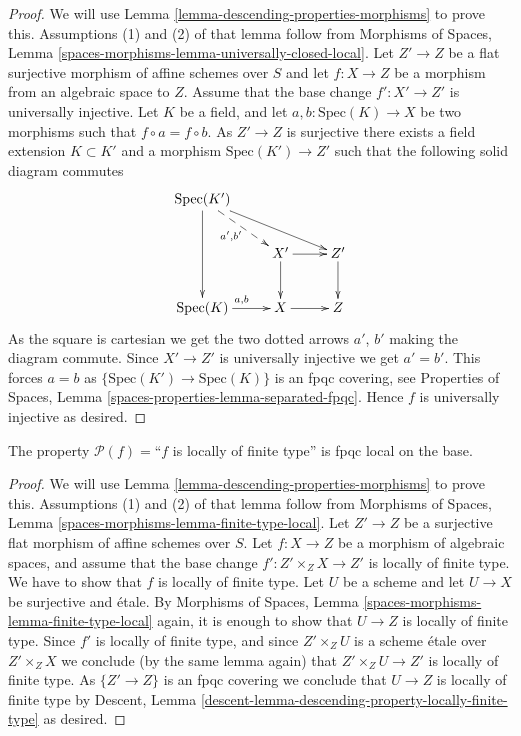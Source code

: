 \begin{proof}
We will use
Lemma \ref{lemma-descending-properties-morphisms}
to prove this. Assumptions (1) and (2) of that lemma follow from
Morphisms of Spaces,
Lemma \ref{spaces-morphisms-lemma-universally-closed-local}.
Let $Z' \to Z$ be a flat surjective morphism of affine schemes
over $S$ and let $f : X \to Z$ be a morphism from an algebraic space to $Z$.
Assume that the base change $f' : X' \to Z'$ is universally injective.
Let $K$ be a field, and let $a, b : \text{Spec}(K) \to X$
be two morphisms such that $f \circ a = f \circ b$.
As $Z' \to Z$ is surjective there exists a field
extension $K \subset K'$ and a morphism
$\text{Spec}(K') \to Z'$
such that the following solid diagram commutes
$$
\xymatrix{
\text{Spec}(K') \ar[rrd] \ar@{-->}[rd]_{a', b'} \ar[dd] \\
 &
X' \ar[r] \ar[d] &
Z' \ar[d] \\
\text{Spec}(K) \ar[r]^{a, b} &
X \ar[r] &
Z
}
$$
As the square is cartesian we get the two dotted arrows $a'$, $b'$ making the
diagram commute. Since $X' \to Z'$ is universally injective we get $a' = b'$.
This forces $a = b$ as $\{\text{Spec}(K') \to \text{Spec}(K)\}$
is an fpqc covering, see
Properties of Spaces, Lemma \ref{spaces-properties-lemma-separated-fpqc}.
Hence $f$ is universally injective as desired.
\end{proof}

\begin{lemma}
\label{lemma-descending-property-locally-finite-type}
The property $\mathcal{P}(f) =$``$f$ is locally of finite type''
is fpqc local on the base.
\end{lemma}

\begin{proof}
We will use
Lemma \ref{lemma-descending-properties-morphisms}
to prove this. Assumptions (1) and (2) of that lemma follow from
Morphisms of Spaces,
Lemma \ref{spaces-morphisms-lemma-finite-type-local}.
Let $Z' \to Z$ be a surjective flat morphism of affine schemes over $S$.
Let $f : X \to Z$ be a morphism of algebraic spaces, and assume
that the base change $f' : Z' \times_Z X \to Z'$ is locally of finite type.
We have to show that $f$ is locally of finite type. Let $U$ be a scheme
and let $U \to X$ be surjective and \'etale. By
Morphisms of Spaces,
Lemma \ref{spaces-morphisms-lemma-finite-type-local}
again, it is enough to show that $U \to Z$ is locally of finite type.
Since $f'$ is locally of finite type, and since $Z' \times_Z U$ is a
scheme \'etale over $Z' \times_Z X$ we conclude (by the same lemma again) that
$Z' \times_Z U \to Z'$ is locally of finite type.
As $\{Z' \to Z\}$ is an fpqc covering we conclude that
$U \to Z$ is locally of finite type by
Descent, Lemma \ref{descent-lemma-descending-property-locally-finite-type}
as desired.
\end{proof}

